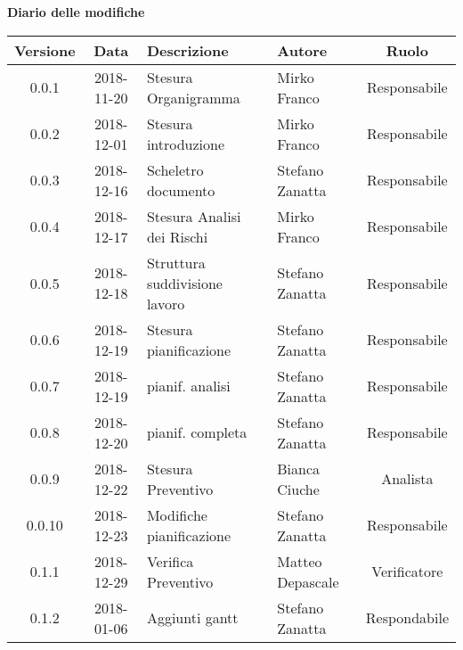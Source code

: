 	\begin{center}
		\textbf{Diario delle modifiche}
	\end{center}
	\begin{center}
		\begin{tabularx}{\textwidth}{|c|c|X|X|c|}
			\hline
			\textbf{Versione} & \textbf{Data} & \textbf{Descrizione} & \textbf{Autore} & \textbf{Ruolo} \\
			\hline
			0.0.1 & 2018-11-20 & Stesura Organigramma & Mirko Franco & Responsabile\\
			\hline
			0.0.2 & 2018-12-01 & Stesura introduzione & Mirko Franco & Responsabile\\
			\hline
			0.0.3 & 2018-12-16 & Scheletro documento &Stefano Zanatta & Responsabile\\
			\hline
			0.0.4 & 2018-12-17 & Stesura Analisi dei Rischi & Mirko Franco & Responsabile\\
			\hline
			0.0.5 & 2018-12-18 & Struttura suddivisione lavoro & Stefano Zanatta & Responsabile\\
			\hline
			0.0.6 & 2018-12-19 & Stesura pianificazione & Stefano Zanatta & Responsabile\\
			\hline
			0.0.7 & 2018-12-19 & pianif. analisi& Stefano Zanatta & Responsabile\\
			\hline
			0.0.8 & 2018-12-20 & pianif. completa& Stefano Zanatta & Responsabile\\
			\hline
			0.0.9 & 2018-12-22 & Stesura Preventivo & Bianca Ciuche & Analista\\
			\hline
			0.0.10 & 2018-12-23 & Modifiche pianificazione & Stefano Zanatta & Responsabile\\
			\hline
			0.1.1 & 2018-12-29 & Verifica Preventivo & Matteo Depascale & Verificatore\\
			\hline
			0.1.2 & 2018-01-06 & Aggiunti gantt & Stefano Zanatta & Respondabile\\
			\hline
			
		\end{tabularx}
	\end{center}
\newpage